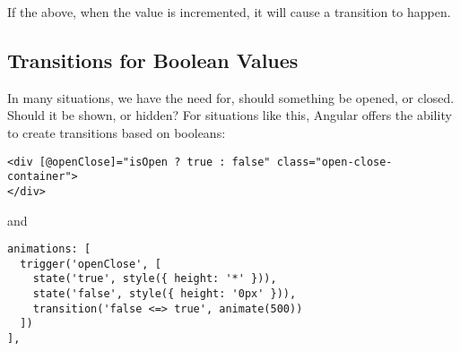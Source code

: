 If the above, when the value is incremented, it will cause a transition to 
happen. 


\subsection{ Transitions for Boolean Values }
In many situations, we have the need for, should something be opened, or closed. 
Should it be shown, or hidden? For situations like this, Angular offers the 
ability to create transitions based on booleans: 
\begin{lstlisting}[caption=open-close.component.html]
<div [@openClose]="isOpen ? true : false" class="open-close-container">
</div>
\end{lstlisting}
and
\begin{lstlisting}[caption=open-close.component.ts]
animations: [
  trigger('openClose', [
    state('true', style({ height: '*' })),
    state('false', style({ height: '0px' })),
    transition('false <=> true', animate(500))
  ])
],
\end{lstlisting}